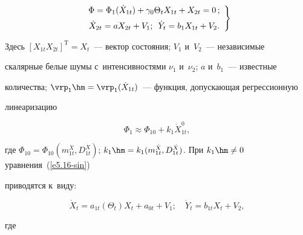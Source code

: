 \begin{equation}

\left.

\begin{array}{c}

\Phi =\Phi_1 (\dot X_{1t}) + \gamma_0 \Theta_t X_{1t} + X_{2t} =0\,;


\\[6pt]

\dot X_{2t} = a X_{2t} + V_1;\enskip \dot Y_t = b_1 X_{1t} + V_2.

\end{array}

\right\}

\label{e5.16-sin}

\end{equation}

Здесь $[X_{1t} X_{2t}]^{\mathrm{T}}=X_t$~--- вектор состояния; $V_1$ и~$V_2$~--- независимые 

скалярные белые шумы с~интенсивностями $\nu_1$ и~$\nu_2$; $a$ и~$b_1$~--- известные 

количества; $\vrp_1 \hm=\vrp_1 (\dot X_{1t})$~--- функция, допускающая регрессионную 

линеаризацию

    \begin{equation*}

    \Phi_1 \approx \Phi_{10} + k_1 \dot X_{1t}^0, %

    \end{equation*}

где $\Phi_{10} =\Phi_{10} (m_{1t}^{\dot X}, D_{1t}^{\dot X})$; $k_1\hm= 

k_1(m_{1t}^{\dot X}, D_{1t}^{\dot X})$. При  $k_1\hm\ne 0$ уравнения~(\ref{e5.16-sin}) 

приводятся к~виду:

\begin{equation*}

\dot X_t = a_{1t}(\Theta_t) X_t + a_{0t} + V_1; %

\quad

\dot Y_t = b_{1t} X_t + V_2, %

\end{equation*}

где  



\vspace*{-2pt} 



